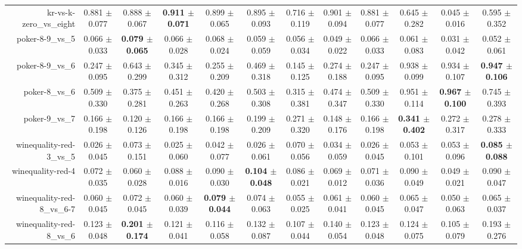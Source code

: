 \begin{table}[!ht]
{\begin{tabular}{r c c c c c c c c c c c}
kr-vs-k-zero\_vs\_eight & 0.881 $\pm$ 0.077 & 0.888 $\pm$ 0.067 & \textbf{0.911 $\pm$ 0.071} & 0.899 $\pm$ 0.065 & 0.895 $\pm$ 0.093 & 0.716 $\pm$ 0.119 & 0.901 $\pm$ 0.094 & 0.881 $\pm$ 0.077 & 0.645 $\pm$ 0.282 & 0.045 $\pm$ 0.016 & 0.595 $\pm$ 0.352 \\
poker-8-9\_vs\_5 & 0.066 $\pm$ 0.033 & \textbf{0.079 $\pm$ 0.065} & 0.066 $\pm$ 0.028 & 0.068 $\pm$ 0.024 & 0.059 $\pm$ 0.059 & 0.056 $\pm$ 0.034 & 0.049 $\pm$ 0.022 & 0.066 $\pm$ 0.033 & 0.061 $\pm$ 0.083 & 0.031 $\pm$ 0.042 & 0.052 $\pm$ 0.061 \\
poker-8-9\_vs\_6 & 0.247 $\pm$ 0.095 & 0.643 $\pm$ 0.299 & 0.345 $\pm$ 0.312 & 0.255 $\pm$ 0.209 & 0.469 $\pm$ 0.318 & 0.145 $\pm$ 0.125 & 0.274 $\pm$ 0.188 & 0.247 $\pm$ 0.095 & 0.938 $\pm$ 0.099 & 0.934 $\pm$ 0.107 & \textbf{0.947 $\pm$ 0.106} \\
poker-8\_vs\_6 & 0.509 $\pm$ 0.330 & 0.375 $\pm$ 0.281 & 0.451 $\pm$ 0.263 & 0.420 $\pm$ 0.268 & 0.503 $\pm$ 0.308 & 0.315 $\pm$ 0.381 & 0.474 $\pm$ 0.347 & 0.509 $\pm$ 0.330 & 0.951 $\pm$ 0.114 & \textbf{0.967 $\pm$ 0.100} & 0.745 $\pm$ 0.393 \\
poker-9\_vs\_7 & 0.166 $\pm$ 0.198 & 0.120 $\pm$ 0.126 & 0.166 $\pm$ 0.198 & 0.166 $\pm$ 0.198 & 0.199 $\pm$ 0.209 & 0.271 $\pm$ 0.320 & 0.148 $\pm$ 0.176 & 0.166 $\pm$ 0.198 & \textbf{0.341 $\pm$ 0.402} & 0.272 $\pm$ 0.317 & 0.278 $\pm$ 0.333 \\
winequality-red-3\_vs\_5 & 0.026 $\pm$ 0.045 & 0.073 $\pm$ 0.151 & 0.025 $\pm$ 0.060 & 0.042 $\pm$ 0.077 & 0.026 $\pm$ 0.061 & 0.070 $\pm$ 0.056 & 0.034 $\pm$ 0.059 & 0.026 $\pm$ 0.045 & 0.053 $\pm$ 0.101 & 0.053 $\pm$ 0.096 & \textbf{0.085 $\pm$ 0.088} \\
winequality-red-4 & 0.072 $\pm$ 0.035 & 0.060 $\pm$ 0.028 & 0.088 $\pm$ 0.016 & 0.090 $\pm$ 0.030 & \textbf{0.104 $\pm$ 0.048} & 0.086 $\pm$ 0.021 & 0.069 $\pm$ 0.012 & 0.071 $\pm$ 0.036 & 0.090 $\pm$ 0.049 & 0.049 $\pm$ 0.021 & 0.090 $\pm$ 0.047 \\
winequality-red-8\_vs\_6-7 & 0.060 $\pm$ 0.045 & 0.072 $\pm$ 0.045 & 0.060 $\pm$ 0.039 & \textbf{0.079 $\pm$ 0.044} & 0.074 $\pm$ 0.063 & 0.055 $\pm$ 0.025 & 0.061 $\pm$ 0.041 & 0.060 $\pm$ 0.045 & 0.065 $\pm$ 0.047 & 0.050 $\pm$ 0.063 & 0.065 $\pm$ 0.037 \\
winequality-red-8\_vs\_6 & 0.123 $\pm$ 0.048 & \textbf{0.201 $\pm$ 0.174} & 0.121 $\pm$ 0.041 & 0.116 $\pm$ 0.058 & 0.132 $\pm$ 0.087 & 0.107 $\pm$ 0.044 & 0.140 $\pm$ 0.054 & 0.123 $\pm$ 0.048 & 0.124 $\pm$ 0.075 & 0.105 $\pm$ 0.079 & 0.193 $\pm$ 0.276 \\

\end{tabular}}
\end{table}
